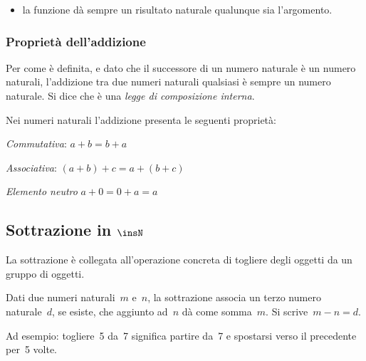 \vspace{-1em}
\begin{osservazione}
\begin{itemize} [nosep]
\item la funzione dà sempre un risultato naturale qualunque sia l'argomento.
\end{itemize}

\end{osservazione}

\subsubsection{Proprietà dell'addizione}

Per come è definita, e dato che il successore di un numero naturale è un 
numero naturali, l'addizione tra due numeri naturali qualsiasi è sempre un
numero naturale. 
Si dice che è una \emph{legge di composizione interna}. 

Nei numeri naturali l'addizione presenta le seguenti proprietà:

\begin{itemize*}
 \item \emph{Commutativa}: \(a + b = b + a\)
 \item \emph{Associativa}: \((a + b) + c = a + (b + c)\)
 \item \emph{Elemento neutro} \(a + 0 = 0 + a = a\)
\end{itemize*}

\subsection{Sottrazione in \(\insN\)}

La sottrazione è collegata all'operazione concreta di togliere degli oggetti 
da un gruppo di oggetti.

\begin{definizione}
Dati due numeri naturali~\(m\) e~\(n\), la sottrazione associa un terzo numero 
naturale~\(d\), se esiste, che aggiunto ad~\(n\) dà come somma~\(m\).
Si scrive~\(m - n = d\).
\end{definizione}

Ad esempio: togliere~5 da~7 significa partire da~7 e spostarsi verso il 
precedente per~5 volte.

